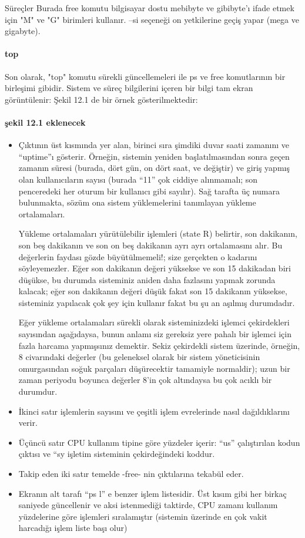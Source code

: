 \begin{section}{Süreçler}
Burada free komutu bilgisayar dostu mebibyte ve gibibyte'ı ifade etmek için "M" ve "G" birimleri kullanır. --si seçeneği on yetkilerine geçiş yapar (mega ve gigabyte).

\paragraph{top}{Son olarak, "top" komutu sürekli güncellemeleri ile ps ve free komutlarının bir birleşimi gibidir. Sistem ve süreç bilgilerini içeren bir bilgi tam ekran görüntülenir: Şekil 12.1 de bir örnek gösterilmektedir:}
\paragraph{şekil 12.1 eklenecek}{}

\begin{itemize}
\item Çıktının üst kısmında yer alan, birinci sıra şimdiki duvar saati zamanını ve “uptime”ı gösterir. Örneğin, sistemin yeniden başlatılmasından sonra geçen zamanın süresi (burada, dört gün, on dört saat, ve değiştir) ve giriş yapmış olan kullanıcıların sayısı (burada “11” çok ciddiye alınmamalı; son penceredeki her oturum bir kullanıcı gibi sayılır). Sağ tarafta üç numara bulunmakta, sözüm ona sistem yüklemelerini tanımlayan yükleme ortalamaları.

Yükleme ortalamaları yürütülebilir işlemleri (state R) belirtir, son dakikanın, son beş dakikanın ve son on beş dakikanın ayrı ayrı ortalamasını alır. Bu değerlerin faydası gözde büyütülmemeli!; size gerçekten o kadarını söyleyemezler. Eğer son dakikanın değeri yüksekse ve son 15 dakikadan biri düşükse, bu durumda sisteminiz aniden daha fazlasını yapmak zorunda kalacak; eğer son dakikanın değeri düşük fakat son 15 dakikanın yüksekse, sisteminiz yapılacak çok şey için kullanır fakat bu şu an aşılmış durumdadır.

Eğer yükleme ortalamaları sürekli olarak sisteminizdeki işlemci çekirdekleri sayısından aşağıdaysa, bunun anlamı siz gereksiz yere pahalı bir işlemci için fazla harcama yapmışsınız demektir. Sekiz çekirdekli sistem üzerinde, örneğin, 8 civarındaki değerler (bu geleneksel olarak bir sistem yöneticisinin omurgasından soğuk parçaları düşürecektir tamamiyle normaldir); uzun bir zaman periyodu boyunca değerler 8’in çok altındaysa bu çok acıklı bir durumdur.

\item İkinci satır işlemlerin sayısını ve çeşitli işlem evrelerinde nasıl dağıldıklarını verir.
\item Üçüncü satır CPU kullanım tipine göre yüzdeler içerir: “us” çalıştırılan kodun çıktısı ve “sy işletim sisteminin çekirdeğindeki koddur.
\item Takip eden iki satır temelde -free- nin çıktılarına tekabül eder.
\item Ekranın alt tarafı “ps l” e benzer işlem listesidir. Üst kısım gibi her birkaç saniyede güncellenir ve aksi istenmediği taktirde, CPU zamanı kullanım yüzdelerine göre işlemleri sıralamıştır (sistemin üzerinde en çok vakit harcadığı işlem liste başı olur) 


\end{itemize}
\end{section}
